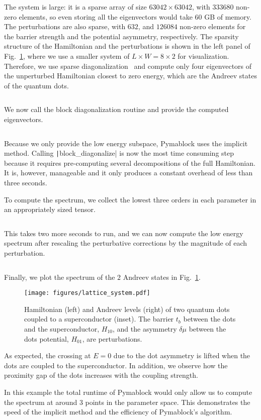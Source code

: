 The system is large: it is a sparse array of size $63042 \times 63042$, with $333680$ non-zero elements, so even storing all the eigenvectors would take $60$ GB of memory.
The perturbations are also sparse, with $632$, and $126084$ non-zero elements for the barrier strength and the potential asymmetry, respectively.
The sparsity structure of the Hamiltonian and the perturbations is shown in the left panel of Fig.~\ref{fig:QD_spectrum}, where we use a smaller system of $L \times W = 8 \times 2$ for visualization.
Therefore, we use sparse diagonalization~\cite{Virtanen_2020} and compute only four eigenvectors of the unperturbed Hamiltonian closest to zero energy, which are the Andreev states of the quantum dots.
%
\inputminted[firstline=61, lastline=62]{python}{code_figures/lattice_system.py}
%
We now call the block diagonalization routine and provide the computed eigenvectors.
%
\inputminted[firstline=64, lastline=64]{python}{code_figures/lattice_system.py}
%
Because we only provide the low energy subspace, Pymablock uses the implicit method.
Calling \texttt|block_diagonalize| is now the most time consuming step because it requires pre-computing several decompositions of the full Hamiltonian.
It is, however, manageable and it only produces a constant overhead of less than three seconds.

To compute the spectrum, we collect the lowest three orders in each parameter in an appropriately sized tensor.
%
\inputminted[firstline=69, lastline=69]{python}{code_figures/lattice_system.py}
%
This takes two more seconds to run, and we can now compute the low energy spectrum after rescaling the perturbative corrections by the magnitude of each perturbation.
%
\inputminted[firstline=72, lastline=77]{python}{code_figures/lattice_system.py}
%
Finally, we plot the spectrum of the $2$ Andreev states in Fig.~\ref{fig:QD_spectrum}.
%
\begin{figure}[h!]
\centering
\texttt{[image: figures/lattice\_system.pdf]}
\caption{
    Hamiltonian (left) and Andreev levels (right) of two quantum dots coupled to a superconductor (inset).
    The barrier $t_b$ between the dots and the superconductor, $H_{10}$, and the asymmetry $\delta \mu$ between the dots potential, $H_{01}$, are perturbations.
}
\label{fig:QD_spectrum}
\end{figure}
%
As expected, the crossing at $E=0$ due to the dot asymmetry is lifted when the dots are coupled to the superconductor.
In addition, we observe how the proximity gap of the dots increases with the coupling strength.

In this example the total runtime of Pymablock would only allow us to compute the spectrum at around $3$ points in the parameter space.
This demonstrates the speed of the implicit method and the efficiency of Pymablock's algorithm.
